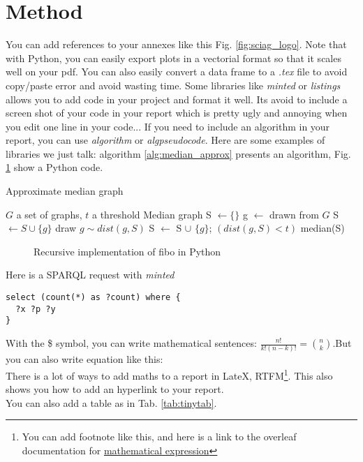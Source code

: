 \section{Method}
You can add references to your annexes like this Fig. \ref{fig:sciag_logo}.
Note that with Python, you can easily export plots in a vectorial format so that it scales well on your pdf. You can also easily convert a data frame to a \textit{.tex} file to avoid copy/paste error and avoid wasting time.
Some libraries like \textit{minted} or \textit{listings} allows you to add code in your project and format it well. Its avoid to include a screen shot of your code in your report which is pretty ugly and annoying when you edit one line in your code...
If you need to include an algorithm in your report, you can use \textit{algorithm} or \textit{algpseudocode}.
Here are some examples of libraries we just talk: algorithm \ref{alg:median_approx} presents an algorithm, Fig. \ref{code:fibo} show a Python code.

\begin{algorithm}[htb]\label{alg:random_alg}
\caption{Approximate median graph}
\label{alg:median_approx}
\begin{algorithmic}[1]
\Require $G$ a set of graphs, $t$ a threshold
\Ensure Median graph
\State S $\leftarrow  \{\}$ 
\State g $\leftarrow$ drawn from $G$
\State S $\leftarrow S \cup \{g\}$\;
\Repeat %
\State     draw $g \sim dist(g,S)$ \;
\State     S $ \leftarrow$ S $\cup$ $\{g\}$;
\Until $(dist(g, S) < t)$
\State \Return median(S)\;
\end{algorithmic}
\end{algorithm}

\begin{figure}[!htb]
    \centering
    
    \caption{Recursive implementation of fibo in Python}
    \label{code:fibo}
\end{figure}
Here is a SPARQL request with \textit{minted}
\begin{verbatim}
select (count(*) as ?count) where {
  ?x ?p ?y
}
\end{verbatim}


With the \$ symbol, you can write mathematical sentences: $\frac{n!}{k!(n-k)!} = \binom{n}{k}$.But you can also write equation like this: 
\begin{equation}
    \mathcal{}
\end{equation}
There is a lot of ways to add maths to a report in LateX, RTFM\footnote{You can add footnote like this, and here is a link to the overleaf documentation for \href{https://www.overleaf.com/learn/latex/Mathematical_expressions}{mathematical expression}}. This also shows you how to add an hyperlink to your report.\\
You can also add a table as in Tab. \ref{tab:tinytab}.

